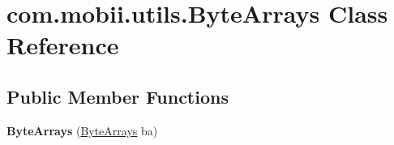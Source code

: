 \hypertarget{classcom_1_1mobii_1_1utils_1_1_byte_arrays}{\section{com.\-mobii.\-utils.\-Byte\-Arrays Class Reference}
\label{classcom_1_1mobii_1_1utils_1_1_byte_arrays}
}
\subsection*{Public Member Functions}
\begin{DoxyCompactItemize}
\item 
\hypertarget{classcom_1_1mobii_1_1utils_1_1_byte_arrays_a827c00a80b973062e0bf7847070ac054}{{\bfseries Byte\-Arrays} (\hyperlink{classcom_1_1mobii_1_1utils_1_1_byte_arrays}{Byte\-Arrays} ba)}\label{classcom_1_1mobii_1_1utils_1_1_byte_arrays_a827c00a80b973062e0bf7847070ac054}


\end{DoxyCompactItemize}
